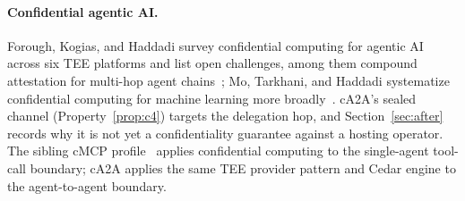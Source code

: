 \paragraph{Confidential agentic AI.}
Forough, Kogias, and Haddadi survey confidential computing for agentic AI across six TEE platforms
and list open challenges, among them compound attestation for multi-hop agent
chains~\citep{secretssurvey2026}; Mo, Tarkhani, and Haddadi systematize confidential computing for
machine learning more broadly~\citep{confai2024}. cA2A's sealed channel
(Property~\ref{prop:c4}) targets the delegation hop, and Section~\ref{sec:after} records why it is
not yet a confidentiality guarantee against a hosting operator. The sibling cMCP
profile~\citep{cmcp2026} applies confidential computing to the single-agent tool-call boundary;
cA2A applies the same TEE provider pattern and Cedar engine to the agent-to-agent boundary.

